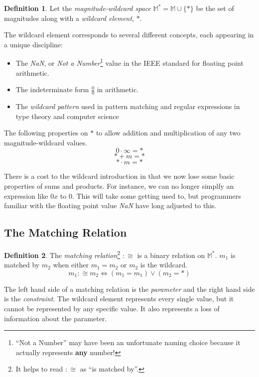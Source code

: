 \documentclass[twoside]{article}
\newcommand{\quotes}[1]{``#1''}
\theoremstyle{plain}%
\theoremstyle{definition}
\newtheorem{definition}{Definition}[section]
\theoremstyle{remark}
\begin{document}
\begin{definition}
Let the \textit{magnitude-wildcard space} \(\mathbb{M}^*= \mathbb{M} \cup \{\ast\}\) be the set of magnitudes along with a \textit{wildcard element}, \(\ast\).
\end{definition}

The wildcard element corresponds to several different concepts, each appearing in a unique discipline:
\begin{itemize}
  \item The \textit{NaN}, or \textit{Not a Number}\footnote{\quotes{Not a Number} may have been an unfortunate naming choice because it actually represents \textbf{any} number!} value in the IEEE standard for floating point arithmetic\cite{ieee}.
  \item The indeterminate form \(\frac{0}{0}\) in arithmetic.
  \item The \textit{wildcard pattern} used in pattern matching and regular expressions in type theory and computer science
\end{itemize}

The following properties on \(\ast\) to allow addition and multiplication of any two magnitude-wildcard values.
\[0 \cdot \infty = \ast\]
\[\ast + m = \ast\]
\[\ast \cdot m = \ast\]

There is a cost to the wildcard introduction in that we now lose some basic properties of sums and products. For instance, we can no longer simplfy an expression like \(0x\) to \(0\). This will take some getting used to, but programmers familiar with the floating point value \textit{NaN} have long adjusted to this.

\subsection{The Matching Relation}

\begin{definition}
The \textit{matching relation}\footnote{It helps to read \(:\cong\) as \quotes{is matched by}.} \(:\cong\) is a binary relation on \(\mathbb{M}^*\). \(m_1\) is matched by \(m_2\) when either \(m_1 = m_2\) or  \(m_2\) is the wildcard.
\[m_1 :\cong m_2 \Longleftrightarrow (m_1 = m_1) \vee (m_2 = \ast)\]
\end{definition}

The left hand side of a matching relation is the \textit{parameter} and the right hand side is the \textit{constraint}. The wildcard element represents every single value, but it cannot be represented by any specific value. It also represents a loss of information about the parameter.
\end{document}
